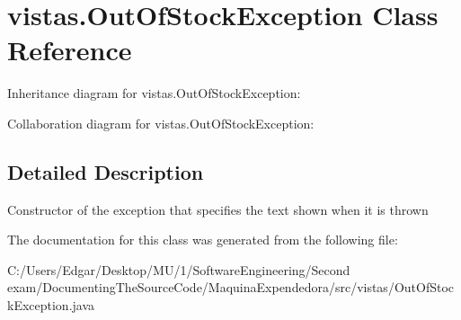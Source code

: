 \hypertarget{classvistas_1_1_out_of_stock_exception}{}\section{vistas.\+Out\+Of\+Stock\+Exception Class Reference}
\label{classvistas_1_1_out_of_stock_exception}


Inheritance diagram for vistas.\+Out\+Of\+Stock\+Exception\+:


Collaboration diagram for vistas.\+Out\+Of\+Stock\+Exception\+:


\subsection{Detailed Description}
Constructor of the exception that specifies the text shown when it is thrown 

The documentation for this class was generated from the following file\+:\begin{DoxyCompactItemize}
\item 
C\+:/\+Users/\+Edgar/\+Desktop/\+M\+U/1/\+Software\+Engineering/\+Second exam/\+Documenting\+The\+Source\+Code/\+Maquina\+Expendedora/src/vistas/Out\+Of\+Stock\+Exception.\+java\end{DoxyCompactItemize}

